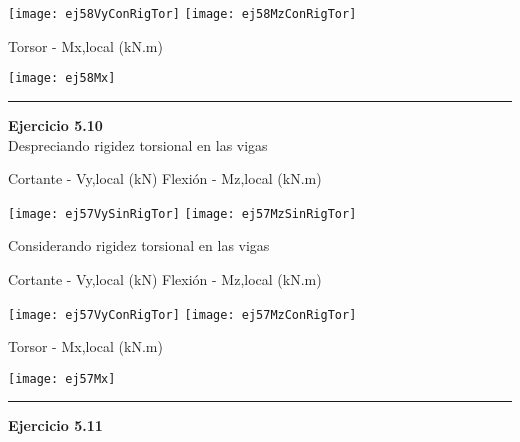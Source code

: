 \texttt{[image: ej58VyConRigTor]}
\texttt{[image: ej58MzConRigTor]}

\begin{center}
	
	Torsor - Mx,local (kN.m)
	
	\texttt{[image: ej58Mx]}
	
\end{center}





\hrule
\vspace{5mm}
\textbf{Ejercicio 5.10}\\

Despreciando rigidez torsional en las vigas

\noindent
Cortante - Vy,local (kN)
\hfill
Flexión - Mz,local (kN.m)

\texttt{[image: ej57VySinRigTor]}
\texttt{[image: ej57MzSinRigTor]}


Considerando rigidez torsional en las vigas


\noindent
Cortante - Vy,local (kN)
\hfill
Flexión - Mz,local (kN.m)


\texttt{[image: ej57VyConRigTor]}
\texttt{[image: ej57MzConRigTor]}

\begin{center}
	
	Torsor - Mx,local (kN.m)
	
	\texttt{[image: ej57Mx]}
	
\end{center}





\hrule
\vspace{5mm}
\textbf{Ejercicio 5.11}\\

\vspace{5mm}


